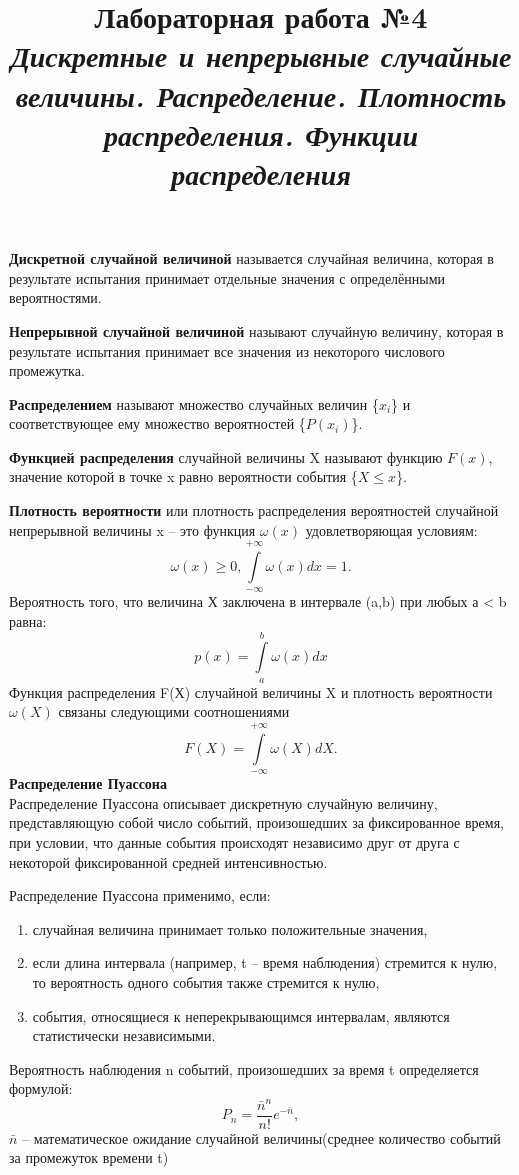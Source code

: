 \documentclass[14pt,a4paper]{article}
\title{Лабораторная работа №4 \\ \textit{Дискретные и непрерывные случайные величины. Распределение. Плотность распределения. Функции распределения}}
\begin{document}
\maketitle
\textbf{Дискретной случайной величиной} называется случайная величина, которая в результате испытания принимает отдельные значения с определёнными вероятностями.

\textbf{Непрерывной случайной величиной} называют случайную величину, которая в результате испытания принимает все значения из некоторого числового промежутка.

\textbf{Распределением} называют множество случайных величин \{$x_i$\} и соответствующее ему множество вероятностей \{$P(x_i)$\}.

\textbf{Функцией распределения} случайной величины X называют функцию $F(x)$, значение которой в точке x  равно вероятности события \{$X \leqslant  x$\}.

\textbf{Плотность вероятности} или плотность распределения вероятностей случайной непрерывной величины x – это функция $\omega(x)$ удовлетворяющая условиям:  
\begin{equation}
    \omega(x) \geqslant 0, \int\limits^{+\infty}_{-\infty}\omega(x)dx = 1.
\end{equation}
Вероятность того, что величина Х заключена в интервале (a,b) при любых а < b равна:
\begin{equation}
    p(x) = \int\limits^b_a \omega(x)dx
\end{equation}
Функция распределения F(Х) случайной величины X и плотность вероятности $\omega(X)$ связаны следующими соотношениями 
\begin{equation}
    F(X) = \int\limits^{+\infty}_{-\infty}\omega(X)dX.
\end{equation}
\textbf{Распределение Пуассона} \\
Распределение Пуассона описывает дискретную случайную величину, представляющую собой число событий, произошедших за фиксированное время, при условии, что данные события происходят независимо друг от друга с некоторой фиксированной средней интенсивностью. 

Распределение Пуассона применимо, если:
\begin{enumerate}
    \item случайная величина принимает только положительные значения, 
    \item если длина интервала (например, t – время наблюдения) стремится к нулю, то вероятность одного события также стремится к нулю,
    \item события, относящиеся к неперекрывающимся интервалам, являются статистически независимыми.
\end{enumerate} 
Вероятность наблюдения n событий, произошедших за время t определяется формулой:
\begin{equation}
    P_n = \frac{{\bar{n}}^n}{n!}e^{-\bar{n}},
\end{equation}
$\bar{n}$ – математическое ожидание случайной величины(среднее количество событий за  промежуток времени t)
\end{document}
